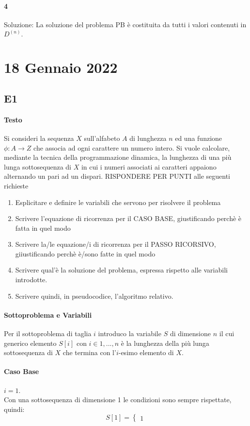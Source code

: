 \documentclass[12pt, a4paper, openany]{book}
\begin{document}
\paragraph*{4}Soluzione:
La soluzione del problema PB è costituita da tutti i valori contenuti in $D^{(n)}$.

\section{18 Gennaio 2022}
\subsection{E1}
\paragraph*{Testo}
Si consideri la sequenza $X$ sull'alfabeto $A$ di lunghezza $n$ ed una funzione $\phi:A\to Z$ che associa ad ogni carattere un numero intero.
Si vuole calcolare, mediante la tecnica della programmazione dinamica, la lunghezza di una più lunga sottosequenza di $X$ in cui i numeri associati ai caratteri appaiono alternando un pari ad un dispari.
RISPONDERE PER PUNTI alle seguenti richieste
\begin{enumerate}
	\item Esplicitare e definire le variabili che servono per risolvere il problema
	\item Scrivere l'equazione di ricorrenza per il CASO BASE, giustificando perchè è fatta in quel modo
	\item Scrivere la/le equazione/i di ricorrenza per il PASSO RICORSIVO, giiustificando perchè è/sono fatte in quel modo
	\item Scrivere qual'è la soluzione del problema, espressa rispetto alle variabili introdotte.
	\item Scrivere quindi, in pseudocodice, l'algoritmo relativo.
\end{enumerate}

\paragraph*{Sottoproblema e Variabili}
Per il sottoproblema di taglia $i$ introduco la variabile $S$ di dimensione $n$ il cui generico elemento
$S[i]$ con $i\in {1,...,n}$ è la lunghezza della più lunga sottosequenza di $X$ che termina con l'$i$-esimo elemento di $X$.

\paragraph*{Caso Base} $i=1$.
\\Con una sottosequenza di dimensione 1 le condizioni sono sempre rispettate, quindi:
$$
S[1]= \begin{cases}
	1
\end{cases}
$$
\end{document}
